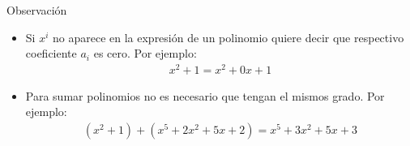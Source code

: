 \documentclass[handout]{beamer} %
\begin{document}
\begin{frame}


\begin{block}{}

    
    \pause
\end{block}
\begin{block}{Observación}
    \begin{itemize}
        \item Si $x^i$ no aparece en la expresión de un polinomio quiere decir que respectivo coeficiente $a_i$ es cero. Por ejemplo:
        \begin{align*}
        x^2+1=x^2+0x+1 
        \end{align*}\pause
    \item Para sumar polinomios no es necesario que tengan el mismos grado. Por ejemplo:
    \begin{align*}
    (x^2+1)+(x^5+2x^2+5x+2)=x^5+3x^2+5x+3
    \end{align*}
    
    
    \end{itemize}
    
    
    
    \end{block}
    
\end{frame}
\end{document}
